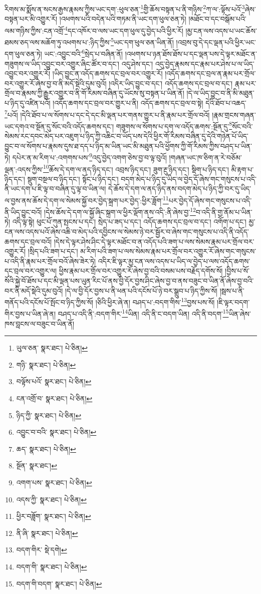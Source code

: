 རིགས་མ་སྨོས་ན་སངས་རྒྱས་རྣམས་ཀྱིས་ཡང་དག་:ཕུལ་ཅན་\footnote{ཡུལ་ཅན་  སྣར་ཐང་།  པེ་ཅིན། }གྱི་ཆོས་བསྟན་པ་ནི་གཉིས་\footnote{གཉི་  སྣར་ཐང་།  པེ་ཅིན། }ཀ་ལ་:ལྟོས་པའོ་\footnote{བལྟོས་པའོ་  སྣར་ཐང་།  པེ་ཅིན། }ཞེས་བསྟན་པར་མི་འགྱུར་རོ། །འཕགས་པའི་བདེན་པའི་གཏམ་ནི་ཡང་དག་ཕུལ་ཅན་ཏེ། །མཐོང་བ་དང་བསྒོམ་པའི་ལམ་གཉིས་ཀྱིས་:ངན་འགྲོ་\footnote{ངན་འགྲོ་བ་  སྣར་ཐང་།  པེ་ཅིན། }དང་འཁོར་བ་ལས་ཡང་དག་ཕུལ་དུ་བྱེད་པའི་ཕྱིར་རོ། །མྱ་ངན་ལས་འདས་པ་ཡང་ཆོས་ཐམས་ཅད་ལས་མཆོག་ཏུ་འཕགས་པ་:ཉིད་ཀྱིས་\footnote{ཉིད་ཀྱི་  སྣར་ཐང་།  པེ་ཅིན། }ཡང་དག་ཕུལ་ཅན་ཡིན་ནོ། །འབྲས་བུ་དེ་དང་ལྡན་པའི་ཕྱིར་ཡང་དག་ཕུལ་ཅན་ཏེ། ཡང་:འབྱུང་བའི་\footnote{འབྱུང་བ་བའི་  སྣར་ཐང་།  པེ་ཅིན། }སྲེད་པ་བཞིན་ནོ། །འཕགས་པ་ཉན་ཐོས་ཐོས་པ་དང་ལྡན་པས་དེ་ལྟར་མཐོང་ན་གཟུགས་ལ་ཡིད་འབྱུང་བར་འགྱུར་ཞིང་ཚོར་བ་དང་། འདུ་ཤེས་དང་། འདུ་བྱེད་རྣམས་དང་རྣམ་པར་ཤེས་པ་ལ་ཡིད་འབྱུང་བར་འགྱུར་རོ། །ཡིད་བྱུང་ན་འདོད་ཆགས་དང་བྲལ་བར་འགྱུར་རོ། །འདོད་ཆགས་དང་བྲལ་ན་རྣམ་པར་གྲོལ་བར་འགྱུར་རོ་ཞེས་བྱ་བ་ནི་མདོ་སྡེའི་དུམ་བུའོ། །འདིར་ཡིད་བྱུང་བ་དང་། འདོད་ཆགས་དང་བྲལ་བ་དང་། རྣམ་པར་གྲོལ་བ་རྣམས་ཀྱི་རྒྱུར་འགྱུར་བ་ནི་གོ་རིམས་བཞིན་དུ་ཡོངས་སུ་བསྟན་པ་ཡིན་ནོ། །དེ་ལ་ཡིད་བྱུང་བ་ནི་མི་མཐུན་པ་ཉིད་དུ་འཛིན་པའོ། །འདོད་ཆགས་དང་བྲལ་བར་གྱུར་པ་ནི། འདོད་ཆགས་དང་བྲལ་བ་སྟེ། དེའི་ཐོབ་པ་འཆད་\footnote{ཆད་  སྣར་ཐང་།  པེ་ཅིན། }པའོ། །དེའི་ཐོབ་པ་ལ་སོགས་པ་དང་དེ་དང་མི་ལྡན་པར་གནས་གྱུར་པ་ནི་རྣམ་པར་གྲོལ་བའོ། །རྣམ་གྲངས་གཞན་ཡང་དགའ་བ་སྔོན་དུ་སོང་བའི་འདོད་ཆགས་དང་། གཟུགས་ལ་སོགས་པ་དག་ལ་འདོད་ཆགས་:སྔོན་དུ་\footnote{སྔོན་  སྣར་ཐང་། }སོང་བའི་སེམས་རང་དབང་མེད་པར་འཇུག་པ་ཉིད་ཀྱི་འཆིང་བ་ཡོད་པས་དེའི་ཕྱིར་གོ་རིམས་བཞིན་དུ་དེའི་གཉེན་པོ་ཡིད་བྱུང་བ་ལ་སོགས་པ་རྣམས་དུས་ཐ་དད་པ་ཉིད་མ་ཡིན་ཡང་མི་མཐུན་པའི་ཕྱོགས་ཀྱི་གོ་རིམས་ཀྱིས་བཤད་པ་ཡིན་ཏེ། དཔེར་ན་མ་རིག་པ་:འགགས་པས་\footnote{འགག་པས་  སྣར་ཐང་།  པེ་ཅིན། }འདུ་བྱེད་འགག་ཅེས་བྱ་བ་ལྟ་བུའོ། །གཞན་ཡང་ཁ་ཅིག་ན་རེ་བཅོམ་ལྡན་:འདས་ཀྱིས་\footnote{འདས་ཀྱི་  སྣར་ཐང་།  པེ་ཅིན། }ཆོས་དེ་དག་ལ་ནད་ཉིད་དང་། འབྲས་ཉིད་དང་། ཟུག་རྔུ་ཉིད་དང་། སྡིག་པ་ཉིད་དང་། མི་རྟག་པ་ཉིད་དང་། སྡུག་བསྔལ་བ་ཉིད་དང་། སྟོང་པ་ཉིད་དང་། བདག་མེད་པ་ཉིད་དུ་ཡིད་ལ་བྱེད་དོ་ཞེས་གང་གསུངས་པ་འདི་ནི་ཡང་དག་པ་ཇི་ལྟ་བ་བཞིན་དུ་ལྟ་བ་ཡིན་ལ། དེ་ཆོས་དེ་དག་ལ་ནད་ཉིད་ནས་བདག་མེད་པ་ཉིད་ཀྱི་བར་དུ་ཡིད་ལ་བྱས་ནས་ཆོས་དེ་དག་ལ་སེམས་སྐྱོ་བར་བྱེད་སྐྲག་པར་བྱེད་:ཕྱིར་ཟློག་\footnote{ཕྱིར་བཟློག་  སྣར་ཐང་།  པེ་ཅིན། }པར་བྱེད་དོ་ཞེས་གང་གསུངས་པ་འདི་ནི་ཡིད་བྱུང་བའོ། །དེས་ཆོས་དེ་དག་ལ་སྐྱོ་ཞིང་སྐྲག་ལ་ཕྱིར་ལྡོག་ནས་འདི་:ནི་ཞེས་བྱ་\footnote{ནི་ཞི་  སྣར་ཐང་།  པེ་ཅིན། }བ་འདི་ནི་གྱ་ནོམ་པ་ཡིན་ཏེ། འདི་ལྟ་སྟེ། ཕུང་པོ་ཀུན་སྤངས་པ་དང་། སྲེད་པ་ཟད་པ་དང་། འདོད་ཆགས་དང་བྲལ་བ་དང་། འགོག་པ་དང་། མྱ་ངན་ལས་འདས་པའོ་ཞེས་འཆི་བ་མེད་པའི་དབྱིངས་ལ་སེམས་ཉེ་བར་སྦྱོར་བ་ཞེས་གང་གསུངས་པ་འདི་ནི་འདོད་ཆགས་དང་བྲལ་བའོ། །དེས་དེ་ལྟར་ཤེས་ཤིང་དེ་ལྟར་མཐོང་བ་ན་འདོད་པའི་ཟག་པ་ལས་སེམས་རྣམ་པར་གྲོལ་བར་འགྱུར་རོ། །སྲིད་པའི་ཟག་པ་དང་། མ་རིག་པའི་ཟག་པ་ལས་སེམས་རྣམ་པར་གྲོལ་བར་འགྱུར་རོ་ཞེས་གང་གསུངས་པ་འདི་ནི་རྣམ་པར་གྲོལ་བའོ་ཞེས་ཟེར་ཏེ། འདིར་ཇི་ལྟར་མྱ་ངན་ལས་འདས་པ་ཡིད་ལ་བྱེད་པ་ལས་འདོད་ཆགས་དང་བྲལ་བར་འགྱུར་ལ། ཕྱིས་རྣམ་པར་གྲོལ་བར་འགྱུར་རོ་ཞེས་བྱ་བའི་བསམ་པས་བརྗོད་དགོས་སོ། །བྱིས་པ་སོ་སོའི་སྐྱེ་བོ་ཐོས་པ་དང་མི་ལྡན་པས་ཡུན་རིང་པོ་ནས་བྱི་དོར་བྱས་ཤིང་ཞེས་བྱ་བ་ནས་བཟུང་བ་ཡིན་ནོ་ཞེས་བྱ་བའི་བར་ནི་མདོ་སྡེའི་དུམ་བུའོ། །དེ་ལ་བྱི་དོར་བྱས་པ་ནི་ཕན་པའི་དངོས་པོ་ཉེ་བར་སྒྲུབ་པ་ཉིད་ཀྱིས་སོ། །སྦས་པ་ནི་གནོད་པའི་དངོས་པོ་སྤོང་བ་ཉིད་ཀྱིས་སོ། །ཅིའི་ཕྱིར་ཞེ་ན། བཤད་པ་:བདག་གིས་\footnote{བདག་གིར་  སྡེ་དགེ། }བྱས་པས་སོ། །ཇི་ལྟར་བདག་གིར་བྱས་པ་ཡིན་ཞེ་ན། བཤད་པ་འདི་ནི་:བདག་གིར་\footnote{བདག་གི་  སྣར་ཐང་།  པེ་ཅིན། }ཡིན། འདི་ནི་ང་བདག་ཡིན། འདི་ནི་བདག་\footnote{བདག་གི་བདག་  སྣར་ཐང་།  པེ་ཅིན། }ཡིན་ཞེས་ཁས་བླངས་ལ་བཟུང་བ་ཡིན་ནོ། 